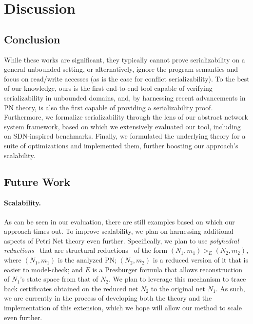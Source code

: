 \section{Discussion}
\label{sec:discussion}

\subsection{Conclusion}

While these works are significant, they typically cannot prove serializability on a general unbounded setting, or alternatively, ignore the program semantics and focus on read/write accesses (as is the case for conflict serializability).
%
To the best of our knowledge, ours is the first end-to-end
tool capable of verifying serializability in unbounded domains, and, by harnessing recent advancements in PN theory, is also the first capable of providing a serializability proof.
%
Furthermore, we formalize serializability through the lens of our abstract network system framework, based on which we extensively evaluated our tool, including on SDN-inspired benchmarks. 
%
Finally, we formulated the underlying theory for a suite of optimizations and implemented them, further boosting our approach’s scalability.

%

\subsection{Future Work}

\paragraph{Scalability.}

As can be seen in our evaluation, there are still examples based on which our approach times out.
To improve scalability, we plan on harnessing additional aspects of Petri Net theory even further.
%
Specifically, we plan to use \textit{polyhedral reductions}~\cite{AmBeDa21} that are structural reductions~\cite{Be87,BeLeDa20} of the form $(N_1, m_1) \vartriangleright_E (N_2, m_2)$, where $(N_1, m_1)$ is the analyzed PN;  $(N_2, m_2)$ is a reduced version of it that is easier to model-check; and $E$ is a Presburger formula that allows reconstruction of $N_1$'s state space from that of $N_2$. We plan to leverage this mechanism to trace back certificates obtained on the reduced net $N_2$ to the original net $N_1$.
%
%
%
As such, we are currently in the process of developing both the theory and the implementation of this extension,
which we hope will allow our method to scale even further.

